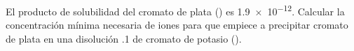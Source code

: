 El producto de solubilidad del cromato de plata () es \num{1,9e-12}. Calcular la concentración mínima necesaria de iones  para que empiece a precipitar cromato de plata en una disolución \SI{,1}{\Molar} de cromato de potasio ().
